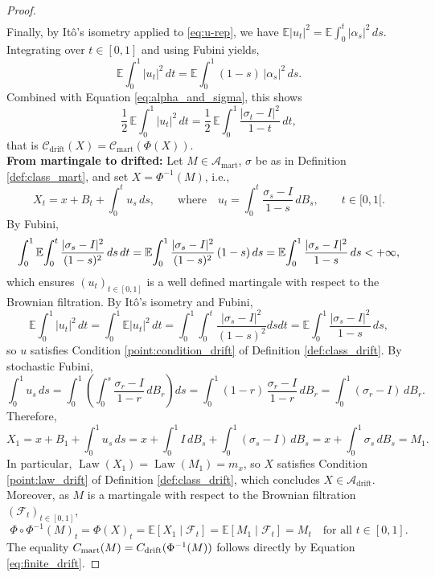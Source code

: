 \documentclass[reqno, a4paper]{amsart}
\theoremstyle{plain}
\theoremstyle{definition}
\theoremstyle{remark}
\numberwithin{equation}{section}
\numberwithin{theorem}{section}
\newcommand{\E}{\mathbb{E}}
\newcommand{\Law}{\operatorname{Law}}
\begin{document}
\begin{proof}
\begin{align*}
		\end{align*}
		Finally, by It\^o's isometry applied to \eqref{eq:u-rep}, we have 
		$
		\E|u_t|^2
		=
		\E\!\int_0^t |\alpha_s|^2\,ds
		$. 
		Integrating over $t\in[0,1]$ and using Fubini yields,
		\[
		\E\!\int_0^1 |u_t|^2\,dt
		=
		\E\!\int_0^1 (1-s)\,|\alpha_s|^2\,ds.
		\]
		Combined with Equation \eqref{eq:alpha_and_sigma}, this shows
		\[
		\frac12\,\E\!\int_0^1 |u_t|^2\,dt
		=
		\frac12\,\E\!\int_0^1 \frac{|\sigma_t-I|^2}{1-t}\,dt,
		\]
		that is $\mathcal C_{\mathrm{drift}}(X)
		=
		\mathcal C_{\mathrm{mart}}(\Phi(X)).$\\
		\newline
		\textbf{From martingale to drifted:} Let $M\in\mathcal A_{\mathrm{mart}}$, $\sigma$ be as in Definition \ref{def:class_mart}, and set $X = \Phi^{-1}(M)$, i.e.,
		\begin{equation*}
			X_t = x+ B_t + \int_0^t u_s\,ds,\qquad \text{where} \quad u_t =\int_0^t \frac{\sigma_s-I}{1-s}\,dB_s,\qquad t\in[0,1[. 
		\end{equation*}	
		By Fubini,
		\begin{equation*}\label{eq:Fubini_drift}
			\int_0^1 \E\!\int_0^t \frac{|\sigma_s-I|^2}{(1-s)^2}\,ds\,dt\\
			=
			\E\!\int_0^1 \frac{|\sigma_s-I|^2}{(1-s)^2}\,(1-s)\,ds
			=
			\E\!\int_0^1 \frac{|\sigma_s-I|^2}{1-s}\,ds < + \infty,
		\end{equation*}
		which ensures $(u_t)_{t \in [0,1]}$ is a well defined martingale with respect to the Brownian filtration. By It\^o's isometry and Fubini,
		\begin{equation}\label{eq:finite_drift}
			\E\!\int_0^1 |u_t|^2\,dt
			=
			\int_0^1 \E|u_t|^2\,dt = \int_0^1 \int_0^t \frac{|\sigma_s-I|^2}{(1-s)^2} ds dt 
			= \E\!\int_0^1 \frac{|\sigma_s-I|^2}{1-s}\,ds,
		\end{equation}
		so $u$ satisfies Condition \eqref{point:condition_drift} of Definition \ref{def:class_drift}. By stochastic Fubini,
		\[
		\int_0^1 u_s\,ds
		=
		\int_0^1 \left(\int_0^s \frac{\sigma_r-I}{1-r}\,dB_r\right) ds
		=
		\int_0^1 (1-r)\,\frac{\sigma_r-I}{1-r}\,dB_r
		=
		\int_0^1 (\sigma_r-I)\,dB_r.
		\]
		Therefore,
		\[
		X_1
		=
		x+B_1+\int_0^1 u_s\,ds
		=
		x+\int_0^1 I\,dB_s + \int_0^1 (\sigma_s-I)\,dB_s
		= x+
		\int_0^1 \sigma_s\,dB_s
		=
		M_1.
		\]
		In particular, $\Law(X_1)=\Law(M_1)=m_x$, so $X$ satisfies Condition \eqref{point:law_drift} of Definition \ref{def:class_drift}, which concludes $X\in\mathcal A_{\mathrm{drift}}$. Moreover, as $M$ is a martingale with respect to the Brownian filtration $(\mathcal{F}_t)_{t \in [0,1]}$,  
		$$
		\Phi \circ \Phi^{-1}(M)_t =\Phi(X)_t
		=
		\E[X_1\mid\mathcal F_t]
		=
		\E[M_1\mid\mathcal F_t]
		=
		M_t \quad \text{for all } t \in [0,1].$$ The equality
		$\mathcal\mathcal C_{\mathrm{mart}}(M) =  C_{\mathrm{drift}}(\Phi^{-1}(M))$ follows directly by Equation \eqref{eq:finite_drift}.
	\end{proof}
	
\end{document}
